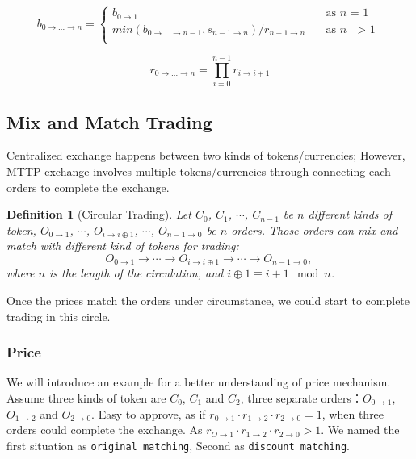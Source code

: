 \documentclass[UTF8,nofonts]{article}
\newtheorem{definition}{Definition}[section]
\begin{document}
\[ b_{0\rightarrow ...\rightarrow n} =
 \begin{cases}
  b_{0\rightarrow 1}   & \quad \text{as } n \text{ = 1}\\
  min(b_{0\rightarrow ...\rightarrow n-1}, s_{n-1\rightarrow n}) / r_{n-1\rightarrow n} & \quad \text{as\ } n \text{ $>$ 1}\\
 \end{cases}
\]


\[ r_{0\rightarrow ...\rightarrow n} = \prod_{i=0}^{n-1}{r_{i\rightarrow i+1}}
\]


\subsection{Mix and Match Trading}

Centralized exchange happens between two kinds of tokens/currencies; However,  MTTP exchange involves multiple tokens/currencies through connecting each orders to complete the exchange.


\begin{definition}[Circular Trading] Let $C_{0}$, $C_{1}$, $\cdots$, $C_{n-1}$ be $n$ different kinds of token, $O_{0\rightarrow 1}$, $\cdots$, $O_{i\rightarrow i\oplus 1}$, $\cdots$, $O_{n-1 \rightarrow 0}$ be $n$ orders. Those orders can mix and match with different kind of tokens for trading:
$$O_{0\rightarrow 1} \rightarrow \cdots \rightarrow O_{i\rightarrow i\oplus 1} \rightarrow \cdots \rightarrow O_{n-1\rightarrow 0} \text{, }$$
where $n$ is the length of the circulation, and $i\oplus 1 \equiv i+1 \mod n$.
\end{definition}

Once the prices match the orders under circumstance,  we could start to complete trading in this circle.

\subsubsection{Price\label{sec: matchprice}}
We will introduce an example for a better understanding of price mechanism. Assume three kinds of token are $C_{0}$, $C_{1}$ and $C_{2}$, three separate orders：$O_{0\rightarrow 1}$, $O_{1 \rightarrow 2}$ and $O_{2 \rightarrow 0}$. Easy to approve, as if $r_{0 \rightarrow 1} \cdot r_{1 \rightarrow 2}\cdot r_{2 \rightarrow 0} = 1$, when three orders could complete the exchange. As $r_{O \rightarrow 1} \cdot r_{1 \rightarrow 2}\cdot r_{2 \rightarrow 0} > 1$. We named the first situation as \texttt{original matching}, Second as \texttt{discount matching}.
\end{document}
